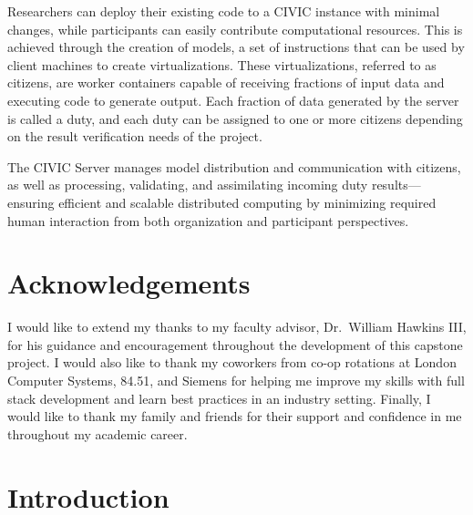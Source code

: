\documentclass[11pt]{article}
\begin{document}
Researchers can deploy their existing code to a CIVIC instance with minimal changes, while participants can easily contribute computational resources. This is achieved through the creation of models, a set of instructions that can be used by client machines to create virtualizations. These virtualizations, referred to as citizens, are worker containers capable of receiving fractions of input data and executing code to generate output. Each fraction of data generated by the server is called a duty, and each duty can be assigned to one or more citizens depending on the result verification needs of the project.

The CIVIC Server manages model distribution and communication with citizens, as well as processing, validating, and assimilating incoming duty results---ensuring efficient and scalable distributed computing by minimizing required human interaction from both organization and participant perspectives.

\vspace{-3mm}
\section*{\large Acknowledgements}
\vspace{-2.5mm}

I would like to extend my thanks to my faculty advisor, Dr.\ William Hawkins III, for his guidance and encouragement throughout the development of this capstone project. I would also like to thank my coworkers from co-op rotations at London Computer Systems, 84.51\degree, and Siemens for helping me improve my skills with full stack development and learn best practices in an industry setting. Finally, I would like to thank my family and friends for their support and confidence in me throughout my academic career.

\vspace{2.5mm}


\section{Introduction}
\end{document}
